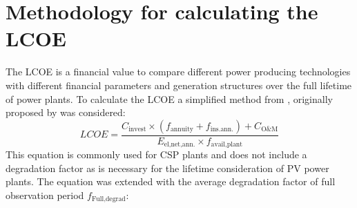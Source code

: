 \chapter{Methodology for calculating the LCOE} \label{ChapterLCOE}
The LCOE is a financial value to compare different power producing technologies with different financial parameters and generation structures over the full lifetime of power plants. To calculate the LCOE a simplified method from \cite{Morin2012}, originally proposed by \cite{Roy1997} was considered:
\begin{equation}
LCOE=\frac{C_{\text{invest}} \times (f_{\text{annuity}}+f_{\text{ins.ann.}})+C_{\text{O\&M}}}{E_{\text{el,net,ann.}}\times f_{\text{avail,plant}}} \label{eq:LCOEold}
\end{equation}
This equation is commonly used for CSP plants and does not include a degradation factor as is necessary for the lifetime consideration of PV power plants. The equation was extended with the average degradation factor of full observation period $f_{\text{Full,degrad}}$:


